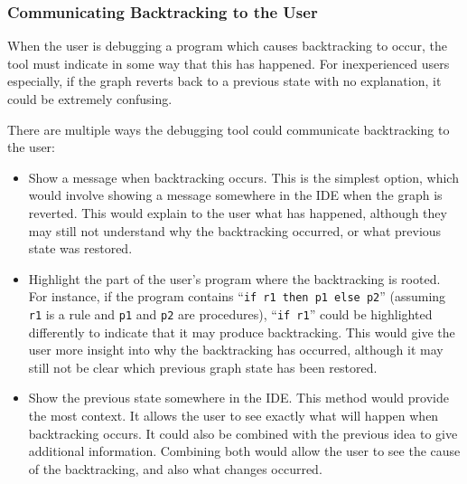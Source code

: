 \documentclass[authoryearcitations]{UoYCSproject}
\begin{document}

\subsubsection{Communicating Backtracking to the User}
\label{sec:CommunicatingBacktrackingToTheUser}

When the user is debugging a program which causes backtracking to occur, the
tool must indicate in some way that this has happened. For inexperienced users
especially, if the graph reverts back to a previous state with no explanation,
it could be extremely confusing.

There are multiple ways the debugging tool could communicate backtracking to
the user:

\begin{itemize}
    \item Show a message when backtracking occurs. This is the simplest option,
          which would involve showing a message somewhere in the IDE when the
          graph is reverted. This would explain to the user what has happened,
          although they may still not understand why the backtracking occurred,
          or what previous state was restored.

    \item Highlight the part of the user's program where the backtracking is
          rooted. For instance, if the program contains
          ``\texttt{if r1 then p1 else p2}'' (assuming \texttt{r1} is a rule
          and \texttt{p1} and \texttt{p2} are procedures), ``\texttt{if r1}''
          could be highlighted differently to indicate that it may produce
          backtracking. This would give the user more insight into why the
          backtracking has occurred, although it may still not be clear which
          previous graph state has been restored.

    \item Show the previous state somewhere in the IDE. This method would
          provide the most context. It allows the user to see exactly what will
          happen when backtracking occurs. It could also be combined with the
          previous idea to give additional information. Combining both would
          allow the user to see the cause of the backtracking, and also what 
          changes occurred.
\end{itemize}

\end{document}

